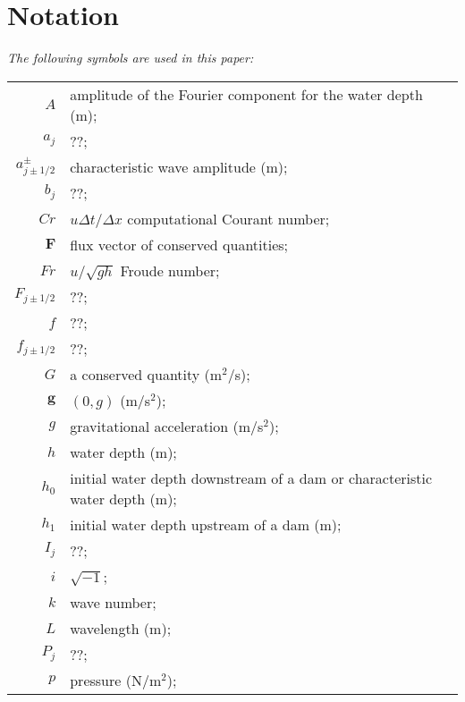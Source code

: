 \documentclass[SingleSpace,12pt]{Serre_ASCE}
\begin{document}
\section{Notation}
\emph{The following symbols are used in this paper:}%
\nopagebreak
\begin{longtable}{r  @{\hspace{1em}=\hspace{1em}}  l}
$A$                    & amplitude of the Fourier component for the water depth (m); \\
$a_j$                  & ??; \\
$a_{j \pm 1/2}^\pm$                    & characteristic wave amplitude (m); \\
$b_j$                  & ??; \\
$Cr$                   & $u \Delta t/\Delta x$ computational Courant number; \\
$\mathbf{F}$           & flux vector of conserved quantities; \\
$Fr$                   & $u/\sqrt{gh}$ Froude number; \\
$F_{j \pm 1/2}$        & ??; \\
$f$                    & ??; \\
$f_{j \pm 1/2}$        & ??; \\
$G$                    & a conserved quantity (m$^2$/s); \\
$\mathbf{g}$           & $(0,g)$ (m/s$^2$); \\
$g$                    & gravitational acceleration (m/s$^2$); \\
$h$                    & water depth (m); \\
$h_0$                  & initial water depth downstream of a dam or characteristic water depth (m); \\
$h_1$                  & initial water depth upstream of a dam (m); \\
$I_j$                  & ??; \\
$i$                    & $\sqrt{-1}$;\\
$k$                    & wave number; \\
$L$                    & wavelength (m); \\
$P_j$                  & ??; \\
$p$                    & pressure (N/m$^2$); \\

\end{longtable}
\end{document}
